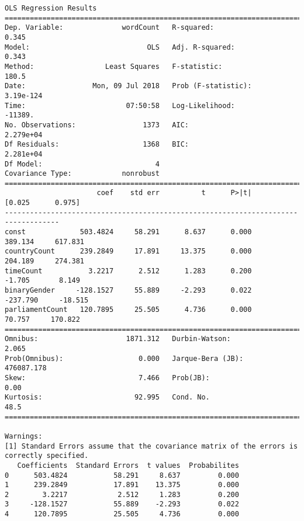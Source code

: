 \documentclass[11pt]{article}
\begin{document}
    \begin{Verbatim}[commandchars=\\\{\}]
                            OLS Regression Results                            
==============================================================================
Dep. Variable:              wordCount   R-squared:                       0.345
Model:                            OLS   Adj. R-squared:                  0.343
Method:                 Least Squares   F-statistic:                     180.5
Date:                Mon, 09 Jul 2018   Prob (F-statistic):          3.19e-124
Time:                        07:50:58   Log-Likelihood:                -11389.
No. Observations:                1373   AIC:                         2.279e+04
Df Residuals:                    1368   BIC:                         2.281e+04
Df Model:                           4                                         
Covariance Type:            nonrobust                                         
===================================================================================
                      coef    std err          t      P>|t|      [0.025      0.975]
-----------------------------------------------------------------------------------
const             503.4824     58.291      8.637      0.000     389.134     617.831
countryCount      239.2849     17.891     13.375      0.000     204.189     274.381
timeCount           3.2217      2.512      1.283      0.200      -1.705       8.149
binaryGender     -128.1527     55.889     -2.293      0.022    -237.790     -18.515
parliamentCount   120.7895     25.505      4.736      0.000      70.757     170.822
==============================================================================
Omnibus:                     1871.312   Durbin-Watson:                   2.065
Prob(Omnibus):                  0.000   Jarque-Bera (JB):           476087.178
Skew:                           7.466   Prob(JB):                         0.00
Kurtosis:                      92.995   Cond. No.                         48.5
==============================================================================

Warnings:
[1] Standard Errors assume that the covariance matrix of the errors is correctly specified.
   Coefficients  Standard Errors  t values  Probabilites
0      503.4824           58.291     8.637         0.000
1      239.2849           17.891    13.375         0.000
2        3.2217            2.512     1.283         0.200
3     -128.1527           55.889    -2.293         0.022
4      120.7895           25.505     4.736         0.000

    \end{Verbatim}
\end{document}
